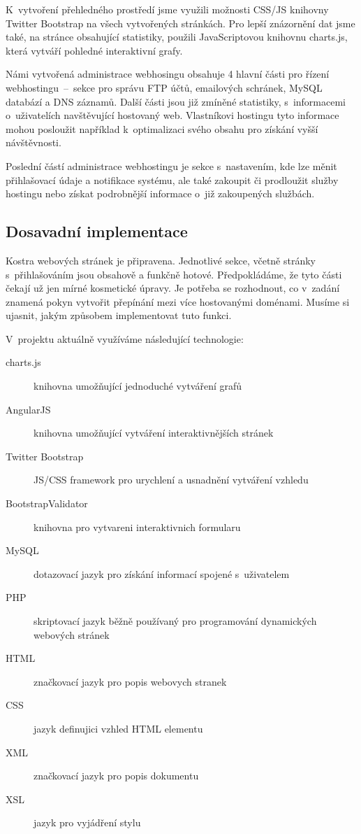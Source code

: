 \documentclass[11pt,a4paper]{article}
\begin{document}
    K~vytvoření přehledného prostředí jsme využili možnosti CSS/JS knihovny
    Twitter Bootstrap na všech vytvořených stránkách.
    Pro lepší znázornění dat jsme také, na stránce obsahující statistiky,
    použili JavaScriptovou knihovnu charts.js, která vytváří pohledné
    interaktivní grafy.

    Námi vytvořená administrace webhosingu obsahuje 4 hlavní části pro řízení
    webhostingu \,--\, sekce pro správu FTP účtů, emailových schránek, MySQL
    databází a DNS záznamů. Další části jsou již zmíněné statistiky,
    s~informacemi o~uživatelích navštěvující hostovaný web. Vlastníkovi
    hostingu tyto informace mohou posloužit například k~optimalizaci svého
    obsahu pro získání vyšší návštěvnosti.

    Poslední částí administrace webhostingu je sekce s~nastavením, kde lze
    měnit přihlašovací údaje a notifikace systému, ale také zakoupit či
    prodloužit služby hostingu nebo získat podrobnější informace o~již
    zakoupených službách.

    \subsection{Dosavadní implementace}

      Kostra webových stránek je připravena. Jednotlivé sekce, včetně
      stránky s~přihlašováním jsou obsahově a funkčně hotové.
      Předpokládáme, že tyto části čekají už jen mírné kosmetické
      úpravy. Je potřeba se rozhodnout, co v~zadání znamená pokyn vytvořit
      přepínání mezi více hostovanými doménami. Musíme si ujasnit, jakým
      způsobem implementovat tuto funkci.

      V~projektu aktuálně využíváme následující technologie:
      \begin{description}
        \item[charts.js] knihovna umožňující jednoduché vytváření grafů
        \item[AngularJS] knihovna umožňující vytváření interaktivnějších
                         stránek
        \item[Twitter Bootstrap] JS/CSS framework pro urychlení a usnadnění
                                 vytváření vzhledu
        \item[BootstrapValidator] knihovna pro vytvareni interaktivnich
                                  formularu
        \item[MySQL] dotazovací jazyk pro získání informací spojené
                     s~uživatelem
        \item[PHP] skriptovací jazyk běžně používaný pro programování
                   dynamických webových stránek
        \item[HTML] značkovací jazyk pro popis webovych stranek
        \item[CSS] jazyk definujici vzhled HTML elementu
        \item[XML] značkovací jazyk pro popis dokumentu
        \item[XSL] jazyk pro vyjádření stylu
      \end{description}
\end{document}
